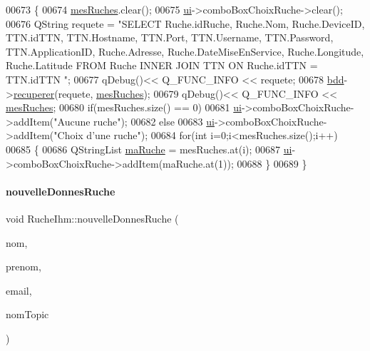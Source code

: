 \begin{DoxyCode}
00673 \{
00674     \hyperlink{class_ruche_ihm_ab7741fa67b19cbb2da7eb12c58cf83c1}{mesRuches}.clear();
00675     \hyperlink{class_ruche_ihm_a64786058bd7f88ca2f1e9743bb27c25b}{ui}->comboBoxChoixRuche->clear();
00676     QString requete = \textcolor{stringliteral}{"SELECT Ruche.idRuche, Ruche.Nom, Ruche.DeviceID, TTN.idTTN, TTN.Hostname, TTN.Port,
       TTN.Username, TTN.Password, TTN.ApplicationID, Ruche.Adresse, Ruche.DateMiseEnService, Ruche.Longitude,
       Ruche.Latitude FROM Ruche INNER JOIN TTN ON Ruche.idTTN = TTN.idTTN "};
00677     qDebug()<< Q\_FUNC\_INFO << requete;
00678     \hyperlink{class_ruche_ihm_a0851936fe212e8d40538264f09749153}{bdd}->\hyperlink{class_base_de_donnees_a77539baad389f5acf754cd2cd452403e}{recuperer}(requete, \hyperlink{class_ruche_ihm_ab7741fa67b19cbb2da7eb12c58cf83c1}{mesRuches});
00679     qDebug()<< Q\_FUNC\_INFO << \hyperlink{class_ruche_ihm_ab7741fa67b19cbb2da7eb12c58cf83c1}{mesRuches};
00680     \textcolor{keywordflow}{if}(mesRuches.size() == 0)
00681         \hyperlink{class_ruche_ihm_a64786058bd7f88ca2f1e9743bb27c25b}{ui}->comboBoxChoixRuche->addItem(\textcolor{stringliteral}{"Aucune ruche"});
00682     \textcolor{keywordflow}{else}
00683         \hyperlink{class_ruche_ihm_a64786058bd7f88ca2f1e9743bb27c25b}{ui}->comboBoxChoixRuche->addItem(\textcolor{stringliteral}{"Choix d'une ruche"});
00684     \textcolor{keywordflow}{for}(\textcolor{keywordtype}{int} i=0;i<mesRuches.size();i++)
00685     \{
00686         QStringList \hyperlink{class_ruche_ihm_a43a6b1fa31f4fba58d919daae3707b38}{maRuche} = mesRuches.at(i);
00687         \hyperlink{class_ruche_ihm_a64786058bd7f88ca2f1e9743bb27c25b}{ui}->comboBoxChoixRuche->addItem(maRuche.at(1));
00688     \}
00689 \}
\end{DoxyCode}
\mbox{\label{class_ruche_ihm_afd6ed2087307a9f8fc75ac1e7bcd8b22}} 
\paragraph{\texorpdfstring{nouvelle\+Donnes\+Ruche}{nouvelleDonnesRuche}}
{\footnotesize\ttfamily void Ruche\+Ihm\+::nouvelle\+Donnes\+Ruche (\begin{DoxyParamCaption}\item[{Q\+String}]{nom,  }\item[{Q\+String}]{prenom,  }\item[{Q\+String}]{email,  }\item[{Q\+String}]{nom\+Topic }\end{DoxyParamCaption})\hspace{0.3cm}{\ttfamily [signal]}}

